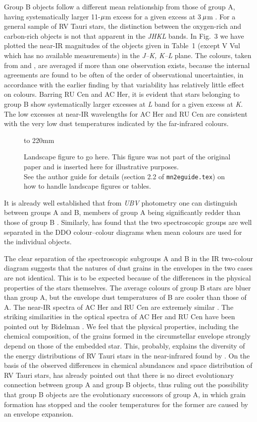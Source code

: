 \documentclass[useAMS,usenatbib]{mn2e}
\begin{document}
Group B objects follow a different mean relationship from those of
group A, having systematically larger 11-$\mu$m excess for a
given excess at 3$\,\mu$m \citep{b15}. For a general sample of RV
Tauri stars, the distinction between the oxygen-rich and
carbon-rich objects is not that apparent in the {\it JHKL\/}
bands. In Fig.~3 we have plotted the near-IR magnitudes of the
objects given in Table~1 (except V Vul which has no available
measurements) in the {\it J--K, K--L\/} plane. The colours,  taken
from \citet{b15} and \citet{b9}, are averaged if more than one
observation exists, because the internal agreements are found to
be often of the order of observational uncertainties, in
accordance with the earlier finding by \citet{b5} that variability
has relatively little effect on colours. Barring RU Cen and AC
Her, it is evident that stars belonging to group B show
systematically larger excesses at {\it L\/} band for a given
excess at {\it K}. The low excesses at near-IR wavelengths for AC
Her and RU Cen are consistent with the very low dust temperatures
indicated by the far-infrared colours.
%
\begin{figure*}
\vbox to 220mm{\vfil Landscape figure to go here. This figure was
not part of the original paper and is inserted here for
illustrative purposes.\\ See the author guide for details (section
2.2 of \verb|mn2eguide.tex|) on how to handle landscape figures or
tables. \caption{} \vfil} \label{landfig}
\end{figure*}

It is already well established that from {\it UBV\/} photometry
one can distinguish between groups A and B,  members of group A
being significantly redder than those of group B \citep{b20}.
Similarly, \citet{b4} has found that the two spectroscopic groups
are well separated in the DDO colour--colour diagrams when mean
colours are used for the individual objects.

The clear separation of the spectroscopic subgroups A and  B in
the IR two-colour diagram suggests that the natures of dust grains
in the envelopes in the two cases are not  identical. This is to
be expected because of the differences in the physical properties
of the stars themselves. The average colours of group B stars are
bluer than group A, but the envelope dust temperatures of B are
cooler than those of A. The near-IR spectra of AC Her and RU Cen
are extremely similar \citep{b6}. The striking similarities in the
optical spectra of AC Her and RU Cen have been pointed out by
Bidelman \citep{b18}. We feel that the physical properties,
including the chemical composition, of the grains  formed in the
circumstellar envelope strongly depend on those of the embedded
star. This, probably, explains the diversity of the energy
distributions of RV Tauri stars in the near-infrared found by
\citet{b6}. On the basis of the observed differences in chemical
abundances and space distribution of RV Tauri stars, \citet{b15}
has already pointed out that there is no direct evolutionary
connection between group A and group B objects, thus ruling out
the possibility that group B objects are the evolutionary
successors of group A, in which grain formation has stopped and
the cooler temperatures for the former are caused by an envelope
expansion.
\end{document}
